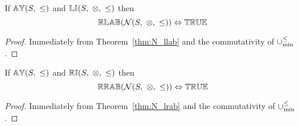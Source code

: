 \begin{theorem} \label{thm:N_rlab}
If ${\mathbb{AY}}(S,\ \leq)$ and ${\mathbb{LI}}(S,\ \otimes,\ \leq)$ then
\begin{equation*}
\propname{RLAB}(\mathcal{N}(S,\ \otimes,\ \leq)) \Leftrightarrow \propname{TRUE}
\end{equation*}
\end{theorem}


\begin{proof}

\vspace{0.5em}
Immediately from Theorem~\ref{thm:N_llab} and the commutativity of $\mathbin{\cup_{\min}^{\leq}}$.
\end{proof}

\begin{theorem} \label{thm:N_rrab}
If ${\mathbb{AY}}(S,\ \leq)$ and ${\mathbb{RI}}(S,\ \otimes,\ \leq)$ then
\begin{equation*}
\propname{RRAB}(\mathcal{N}(S,\ \otimes,\ \leq)) \Leftrightarrow \propname{TRUE}
\end{equation*}
\end{theorem}


\begin{proof}

\vspace{0.5em}
Immediately from Theorem~\ref{thm:N_lrab} and the commutativity of $\mathbin{\cup_{\min}^{\leq}}$.
\end{proof}
